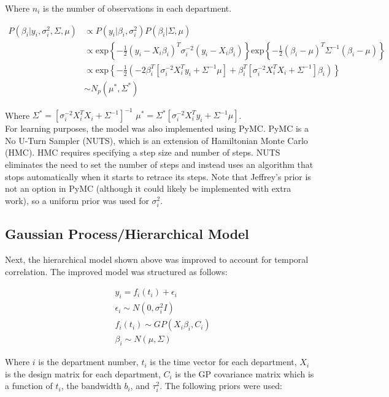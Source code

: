 \documentclass[paper=a4, fontsize=11pt]{scrartcl}
\begin{document}
Where $n_i$ is the number of observations in each department.

\begin{align*}
     P(\beta_i | y_i, \sigma^2_i, \Sigma, \mu ) & \propto P(y_i| \beta_i,  \sigma^2_i)P(\beta_i| \Sigma, \mu) \\
     & \propto\mbox{exp}\left \{ -\frac{1}{2}(y_i-X_i\beta_i)^T \sigma^{-2}_i(y_i-X_i\beta_i)      \right \} \mbox{exp}\left \{ -\frac{1}{2}(\beta_i-\mu)^T \Sigma^{-1}(\beta_i-\mu)      \right \} \\
     & \propto \mbox{exp}\left \{ -\frac{1}{2}\left(-2\beta_i^T[\sigma^{-2}_iX_i^Ty_i + \Sigma^{-1}\mu] + \beta_i^T[\sigma^{-2}_i X^T_i X_i + 
     \Sigma^{-1}]\beta_i \right)      \right \}\\
    &\sim N_p (\mu^*, \Sigma^*)
\end{align*}


Where  $\Sigma^*=[\sigma^{-2}_iX^T_iX_i + 
     \Sigma^{-1}]^{-1} $ $\mu^*=\Sigma^*[\sigma^{-2}_i X_i^T y_i + \Sigma^{-1}\mu]$.\\


For learning purposes, the model was also implemented using PyMC. PyMC is a No U-Turn Sampler (NUTS), which is an extension of Hamiltonian Monte Carlo (HMC). HMC requires specifying a step size and number of steps. NUTS eliminates the need to set the number of steps and instead uses an algorithm that stops automatically
when it starts to retrace its steps. Note that Jeffrey's prior is not an option in PyMC (although it could likely be implemented with extra work), so a uniform prior was used for $\sigma_i^2$.

\subsection{Gaussian Process/Hierarchical Model}
Next, the hierarchical model shown above was improved to account for temporal correlation. The improved model was structured as follows:

\begin{align*}
    &y_i = f_i (t_i) + \epsilon_i \\
     &\epsilon_i \sim N(0, \sigma^2_i I)\\
     &f_i (t_i) \sim GP(X_i \beta_i, C_i)\\
     & \beta_i \sim N(\mu, \Sigma)
\end{align*}

Where $i$ is the department number, $t_i$ is the time vector for each department, $X_i$ is the design matrix for each department, $C_i$ is the GP covariance matrix which is a function of $t_i$, the bandwidth $b_i$, and $\tau^2_i$. The following priors were used:
\end{document}
